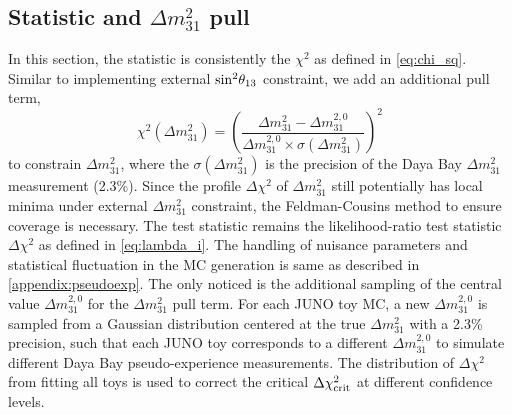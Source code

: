 \subsection{Statistic and $\Delta m^2_{31}$ pull}
In this section, the statistic is consistently the $\chi^2$ as defined in \autoref{eq:chi_sq}. Similar to implementing external $\rm sin^2\theta_{13}$ constraint, we add an additional pull term, 
\begin{equation}
\chi^2(\Delta m^2_{31}) = \left(\frac{\Delta m^2_{31} - \Delta m^{2,0}_{31}}{\Delta m^{2,0}_{31} \times \sigma(\Delta m^2_{31})}\right)^2
\end{equation}
to constrain $\Delta m^2_{31}$, where the $\sigma(\Delta m^2_{31})$ is the precision of the Daya Bay $\Delta m^2_{31}$ measurement (2.3\%). Since the profile $\Delta\chi^2$ of $\Delta m^2_{31}$ still potentially has local minima under external $\Delta m^2_{31}$ constraint, the Feldman-Cousins method to ensure coverage is necessary. The test statistic remains the likelihood-ratio test statistic $\Delta\chi^2$ as defined in \autoref{eq:lambda_i}. The handling of nuisance parameters and statistical fluctuation in the MC generation is same as described in \autoref{appendix:pseudoexp}. The only noticed is the additional sampling of the central value $\Delta m^{2,0}_{31}$ for the $\Delta m^2_{31}$ pull term. For each JUNO toy MC, a new $\Delta m^{2,0}_{31}$ is sampled from a Gaussian distribution centered at the true $\Delta m^2_{31}$ with a 2.3\% precision, such that each JUNO toy corresponds to a different $\Delta m^{2,0}_{31}$ to simulate different Daya Bay pseudo-experience measurements. The distribution of $\Delta\chi^2$ from fitting all toys is used to correct the critical $\Delta\chi^2_{\rm crit}$ at different confidence levels.

